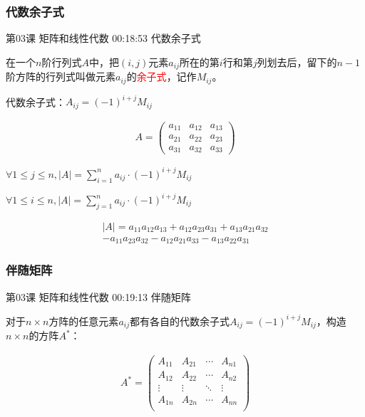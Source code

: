 \documentclass[UTF8]{ctexbook}
\begin{document}
\subsubsection{代数余子式}

第03课 矩阵和线性代数 00:18:53 代数余子式

在一个$n$阶行列式$A$中，把$(i,j)$元素$a_{ij}$所在的第$i$行和第$j$列划去后，留下的$n-1$阶方阵的行列式叫做元素$a_{ij}$的\textcolor{red}{余子式}，记作$M_{ij}$。

代数余子式：$A_{ij}=(-1)^{i+j}M_{ij}$

\begin{equation}
\begin{aligned}
A=
\begin{pmatrix}
a_{11} & a_{12} & a_{13} \\
a_{21} & a_{22} & a_{23} \\
a_{31} & a_{32} & a_{33}
\end{pmatrix}
\end{aligned}
\end{equation}

$\forall 1 \leq j \leq n, |A|= \sum_{i=1}^{n} a_{ij} \cdot (-1)^{i+j} M_{ij}$

$\forall 1 \leq i \leq n, |A|= \sum_{j=1}^{n} a_{ij} \cdot (-1)^{i+j} M_{ij}$

\begin{equation}
\begin{aligned}
|A|=a_{11}a_{12}a_{13}+a_{12}a_{23}a_{31}+a_{13}a_{21}a_{32} \\
-a_{11}a_{23}a_{32}-a_{12}a_{21}a_{33}-a_{13}a_{22}a_{31}
\end{aligned}
\end{equation}

\subsubsection{伴随矩阵}

第03课 矩阵和线性代数 00:19:13 伴随矩阵

对于$n \times n$方阵的任意元素$a_{ij}$都有各自的代数余子式$A_{ij}=(-1)^{i+j}M_{ij}$，构造$n \times n$的方阵$A^{*}$：

\begin{equation}
\begin{aligned}
A^{*}=
\begin{pmatrix}
A_{11} & A_{21} & \cdots & A_{n1} \\
A_{12} & A_{22} & \cdots & A_{n2} \\
\vdots & \vdots & \ddots & \vdots \\
A_{1n} & A_{2n} & \cdots & A_{nn} \\
\end{pmatrix}
\end{aligned}
\end{equation}
\end{document}
